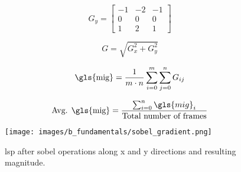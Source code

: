     \begin{equation}
        G_y = 
        \begin{bmatrix}
            -1 & -2 & -1 \\
            0 & 0 & 0 \\
            1 & 2 & 1 
        \end{bmatrix}
        \label{eqn:g_y}
    \end{equation}

    \begin{equation}
        G = \sqrt{G_x^2 + G_y^2}
        \label{eqn:mag_eqn}
    \end{equation}

    \begin{equation}
        \text{\gls{mig}} = \frac{1}{m \cdot n} \sum_{i=0}^{m} \sum_{j=0}^{n} G_{ij}
        \label{eqn:mig}
    \end{equation}

    \begin{equation}
        \text{Avg. \gls{mig}} = \frac{\sum_{i=0}^{n} \gls{mig}_i}{\text{Total number of frames}}
        \label{eqn:avg_mig}
    \end{equation}

    \begin{figure}[h]
        \centering
        \texttt{[image: images/b\_fundamentals/sobel\_gradient.png]}
        \caption{\gls{lsp} after sobel operations along x and y directions and resulting magnitude.}
        \label{fig:sobel_gradient.png}
    \end{figure}

    \clearpage
